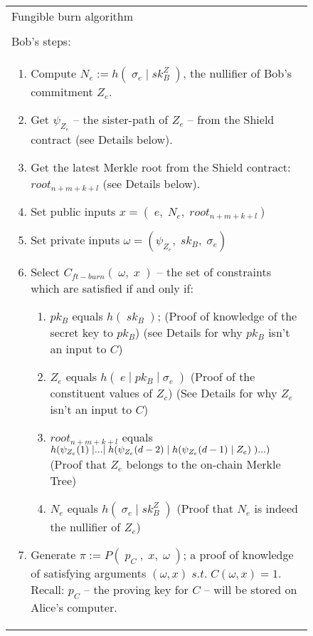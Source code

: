 \documentclass{article}
\newcounter{ongoingEnumCounter}%
\DeclarePairedDelimiter\br{(}{)}
\begin{document}
\newpage
\begin{figure}[H]
  \ContinuedFloat*
	\begin{center}
		\begin{framed}
      \begin{tabular}{p{16cm}}
        Fungible burn algorithm \\
        \\
        \hline
        Bob's steps:\\
        \begin{enumerate}
          \setcounter{enumi}{\value{ongoingEnumCounter}}
          \item Compute $N_e := h(\;\sigma_e\;|\;sk^Z_B\;)$, the nullifier of Bob's commitment $Z_e$.
          \item Get $\psi_{Z_e}$ -- the sister-path of $Z_e$ -- from the Shield contract (see Details below).
          \item Get the latest Merkle root from the Shield contract: $root_{n+m+k+l}$ (see Details below).
          \item Set public inputs $x = (\;e,\;N_e,\;root_{n+m+k+l})$
          \item Set private inputs $\omega = (\psi_{Z_e},\;sk_B,\;\sigma_e)$
          \item Select $C_{ft-burn}(\;\omega,\;x\;)$ -- the set of constraints which are satisfied if and only if:
          \begin{enumerate}
            \item $pk_B$ equals $h(\;sk_B\;)$; (Proof of knowledge of the secret key to $pk_B$) (see Details for why $pk_B$ isn't an input to $C$)
            \item $Z_e$ equals $h(\;e\;|\;pk_B\;|\;\sigma_e\;)$ (Proof of the constituent values of $Z_c$)
            (See Details for why $Z_e$ isn't an input to $C$)
            \item $root_{n+m+k+l}$ equals $h\br*{\psi_{Z_e}(1)\;|...|\;h\br*{\psi_{Z_e}(d-2)\;|\;h\br*{\psi_{Z_e}(d-1)\;|\;Z_e}\;}...}$ (Proof that $Z_e$ belongs to the on-chain Merkle Tree)
            \item $N_e$ equals $h(\;\sigma_e\;|\;sk^Z_B\;)$ (Proof that $N_e$ is indeed the nullifier of $Z_e$)
          \end{enumerate}
          \item Generate $\pi := P(\;p_C\;,\;x,\;\omega\;)$; a proof of knowledge of satisfying arguments $(\omega, x)\;s.t.\;C(\omega, x) = 1$. Recall: $p_C$ -- the proving key for $C$ -- will be stored on Alice's computer.


\end{enumerate}
\end{tabular}
\end{framed}
\end{center}
\end{figure}
\end{document}
